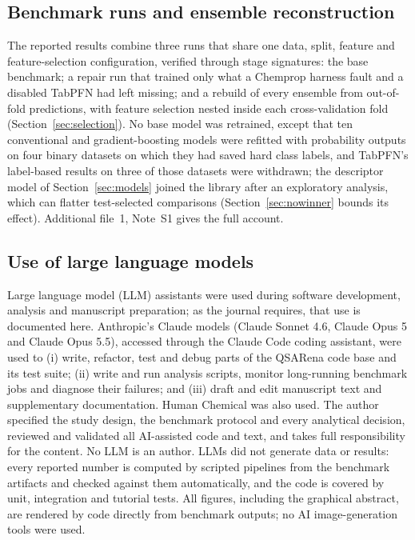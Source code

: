 \subsection{Benchmark runs and ensemble reconstruction}\label{sec:lineage}

The reported results combine three runs that share one data, split, feature and feature-selection configuration, verified through stage signatures: the base benchmark; a repair run that trained only what a Chemprop harness fault and a disabled TabPFN had left missing; and a rebuild of every ensemble from out-of-fold predictions, with feature selection nested inside each cross-validation fold (Section~\ref{sec:selection}). No base model was retrained, except that ten conventional and gradient-boosting models were refitted with probability outputs on four binary datasets on which they had saved hard class labels, and TabPFN's label-based results on three of those datasets were withdrawn; the descriptor model of Section~\ref{sec:models} joined the library after an exploratory analysis, which can flatter test-selected comparisons (Section~\ref{sec:nowinner} bounds its effect). Additional file~1, Note~S1 gives the full account.

\subsection{Use of large language models}\label{sec:llm}

Large language model (LLM) assistants were used during software development, analysis and manuscript preparation; as the journal requires, that use is documented here. Anthropic's Claude models (Claude Sonnet 4.6, Claude Opus 5 and Claude Opus 5.5), accessed through the Claude Code coding assistant, were used to (i) write, refactor, test and debug parts of the QSARena code base and its test suite; (ii) write and run analysis scripts, monitor long-running benchmark jobs and diagnose their failures; and (iii) draft and edit manuscript text and supplementary documentation. Human Chemical was also used. The author specified the study design, the benchmark protocol and every analytical decision, reviewed and validated all AI-assisted code and text, and takes full responsibility for the content. No LLM is an author. LLMs did not generate data or results: every reported number is computed by scripted pipelines from the benchmark artifacts and checked against them automatically, and the code is covered by unit, integration and tutorial tests. All figures, including the graphical abstract, are rendered by code directly from benchmark outputs; no AI image-generation tools were used.

